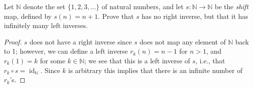 \documentclass[12pt]{article}
\theoremstyle{remark}
\DeclareMathOperator{\id}{id}
\begin{document}
\begin{problem}\label{exc:2.1.3}
  Let $\mathbb{N}$ denote the set $\{1,2,3,\ldots\}$ of natural numbers, and let $s\colon \mathbb{N} \to \mathbb{N}$ be the \emph{shift} map, defined by $s(n) = n + 1$. Prove that $s$ has no right inverse, but that it has infinitely many left inverses.
\end{problem}
\begin{proof}
  $s$ does not have a right inverse since $s$ does not map any element of $\mathbb{N}$ back to 1; however, we can define a left inverse $r_k(n) = n-1$ for $n > 1$, and $r_k(1) = k$ for some $k \in \mathbb{N}$; we see that this is a left inverse of $s$, i.e., that $r_k \circ s = \id_{\mathbb{N}}$. Since $k$ is arbitrary this implies that there is an infinite number of $r_k$'s.
\end{proof}
\end{document}
